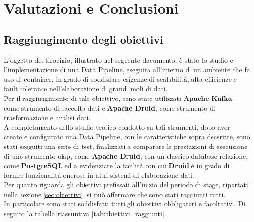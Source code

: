 \chapter{Valutazioni e Conclusioni}
\label{cap:conclusioni}
\section{Raggiungimento degli obiettivi}
L'oggetto del tirocinio, illustrato nel seguente documento, è stato lo studio e l'implementazione di una \gls{Data Pipeline}{}, eseguita all'interno di un ambiente che fa uso di \gls{container}{}, in grado di 
soddisfare esigenze di scalabilità, alta efficienze e \gls{fault tolerance}{} nell'elaborazione di grandi moli di dati.\\
Per il raggiungimento di tale obiettivo, sono state utilizzati \textbf{Apache Kafka}, come strumento di raccolta dati e 
\textbf{Apache Druid}, come strumento di trasformazione e analisi dati.\\
A completamento dello studio teorico condotto su tali strumenti, 
dopo aver creato e configurato una \gls{Data Pipeline}{}, con le caratteristiche sopra decsritte, 
sono stati eseguiti una serie di test, finalizzati a comparare 
le prestazioni di esecuzione di uno strumento \gls{olap}{}, come \textbf{Apache Druid}, con 
un classico database relazione, come \textbf{PostgreSQL} ed a evidenziare la facilità con cui \textbf{Druid} è in grado di 
fornire funzionalità onerose in altri sistemi di elaborazione dati.\\
Per quanto riguarda gli obiettivi prefissati all'inizio del periodo di stage, riportati nella sezione \ref{sec:obiettivi}, si può affermare che sono stati raggiunti tutti.\\
In particolare sono stati soddisfatti tutti gli obiettivi obbligatori e facoltativi. Di seguito la tabella riassuntiva \ref{tab:obiettivi_raggiunti}.\\

